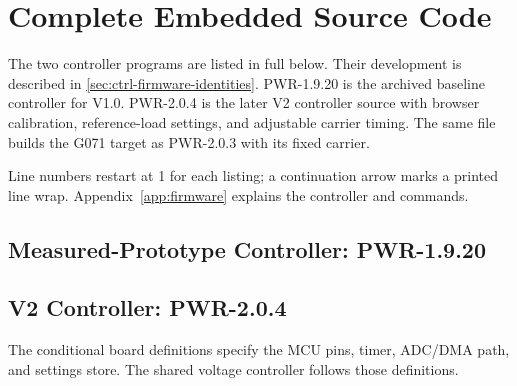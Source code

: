 \chapter{Complete Embedded Source Code}
\label{app:full-embedded-source}

The two controller programs are listed in full below. Their development is described in \cref{sec:ctrl-firmware-identities}. PWR-1.9.20 is the
archived baseline controller for V1.0. PWR-2.0.4 is
the later V2 controller source with browser calibration, reference-load settings,
and adjustable carrier timing. The same file builds the G071 target as
PWR-2.0.3 with its fixed carrier.

Line numbers restart at 1 for each listing; a continuation arrow marks a printed line wrap. Appendix~\ref{app:firmware} explains the controller and commands.

\section{Measured-Prototype Controller: PWR-1.9.20}
\label{sec:source-pwr1920}





\clearpage
\section{V2 Controller: PWR-2.0.4}
\label{sec:source-pwr204}

The conditional board definitions specify the MCU pins, timer,
ADC/DMA path, and settings store. The shared voltage controller
follows those definitions.




